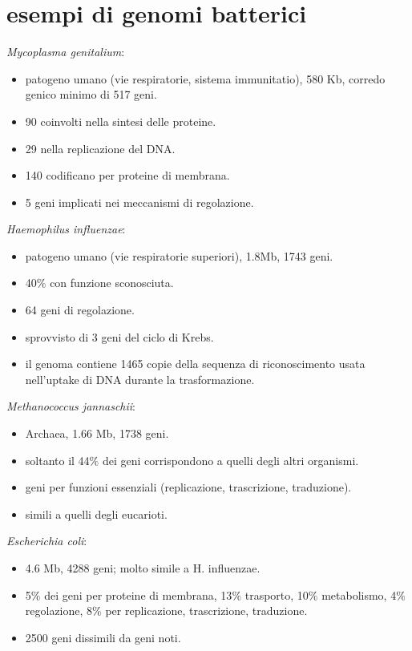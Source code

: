\section{esempi di genomi batterici}
\begin{multicols}{2}
\textit{Mycoplasma genitalium}:
\begin{itemize}
    \item patogeno umano (vie respiratorie, sistema immunitatio), 580 Kb, corredo genico minimo di 517 geni.
    \item 90 coinvolti nella sintesi delle proteine.
    \item 29 nella replicazione del DNA.
    \item 140 codificano per proteine di membrana.
    \item 5 geni implicati nei meccanismi di regolazione.
\end{itemize}
\textit{Haemophilus influenzae}:
\begin{itemize}
    \item patogeno umano (vie respiratorie superiori), 1.8Mb, 1743 geni.
    \item 40$\%$ con funzione sconosciuta.
    \item 64 geni di regolazione.
    \item sprovvisto di 3 geni del ciclo di Krebs.
    \item il genoma contiene 1465 copie della sequenza di riconoscimento usata nell'uptake di DNA durante la trasformazione.
\end{itemize}
\textit{Methanococcus jannaschii}: 
\begin{itemize}
    \item Archaea, 1.66 Mb, 1738 geni.
    \item soltanto il 44$\%$ dei geni corrispondono a quelli degli altri organismi.
    \item geni per funzioni  essenziali (replicazione, trascrizione, traduzione).
    \item simili a quelli degli eucarioti.
\end{itemize}
\textit{Escherichia coli}: 
\begin{itemize}
    \item 4.6 Mb, 4288 geni; molto simile a H. influenzae.
    \item 5$\%$ dei geni per proteine di membrana, 13$\%$ trasporto, 10$\%$ metabolismo, 4$\%$ regolazione, 8$\%$ per replicazione, trascrizione, traduzione.
    \item 2500 geni dissimili da geni noti.

\end{itemize}
\end{multicols}
